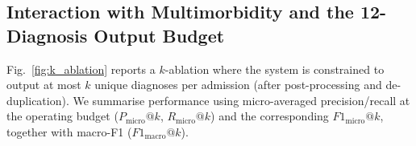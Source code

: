 


\subsection{Interaction with Multimorbidity and the 12-Diagnosis Output Budget}
\label{subsec:results-task1-budget}

Fig.~\ref{fig:k_ablation} reports a $k$-ablation where the system is constrained to output at most $k$ unique diagnoses per admission (after post-processing and de-duplication). We summarise performance using micro-averaged precision/recall at the operating budget ($P_{\text{micro}}@k$, $R_{\text{micro}}@k$) and the corresponding $F1_{\text{micro}}@k$, together with macro-F1 ($F1_{\text{macro}}@k$).

